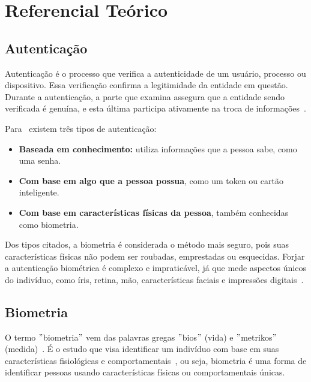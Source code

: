 

\chapter{Referencial Teórico}\label{ch:referencial_teorico}


\section{Autenticação}\label{sec:autenticacao}
Autenticação é o processo que verifica a autenticidade de um usuário, processo ou dispositivo.
Essa verificação confirma a legitimidade da entidade em questão.
Durante a autenticação, a parte que examina assegura que a entidade sendo verificada é genuína, e esta última participa ativamente na troca de informações~\cite{usmonov2021identification}.

Para~\cite{dos2019tecnologias} existem três tipos de autenticação:

\begin{itemize}
    \item \textbf{Baseada em conhecimento:} utiliza informações que a pessoa sabe, como uma senha.
    \item \textbf{Com base em algo que a pessoa possua}, como um token ou cartão inteligente.
    \item \textbf{Com base em características físicas da pessoa}, também conhecidas como biometria.
\end{itemize}

Dos tipos citados, a biometria é considerada o método mais seguro, pois suas características físicas não podem ser roubadas, emprestadas ou esquecidas.
Forjar a autenticação biométrica é complexo e impraticável, já que mede aspectos únicos do indivíduo, como íris, retina, mão, características faciais e impressões digitais~\cite{dos2019tecnologias}.


\section{Biometria}\label{sec:biometria}
O termo \("\)biometria\("\) vem das palavras gregas \("\)bios\("\) (vida) e \("\)metrikos\("\) (medida)~\cite{magalhaes2003biometria}.
É o estudo que visa identificar um indivíduo com base em suas características fisiológicas e comportamentais~\cite{handa2019comparative}, ou seja, biometria é uma forma de identificar pessoas usando características físicas ou comportamentais únicas.

